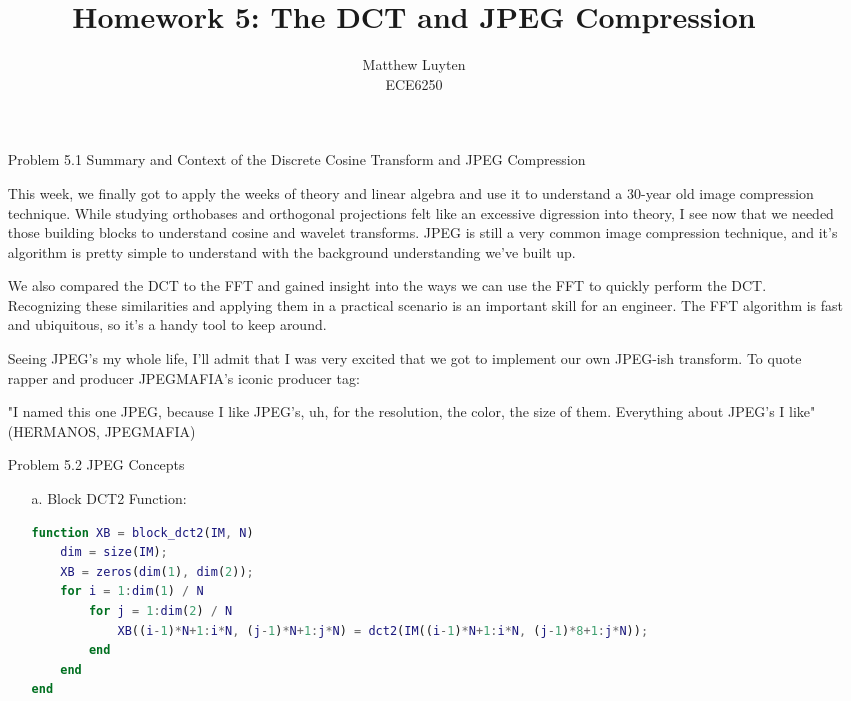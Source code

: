 \documentclass[12pt]{article}
\begin{document}
 
\title{Homework 5: The DCT and JPEG Compression}
\author{Matthew Luyten\\
ECE6250}

\maketitle

\begin{enumerate}
\item[Problem 5.1] Summary and Context of the Discrete Cosine Transform and JPEG Compression

This week, we finally got to apply the weeks of theory and linear algebra and use it to understand
a 30-year old image compression technique. While studying orthobases and orthogonal projections
felt like an excessive digression into theory, I see now that we needed those building blocks to
understand cosine and wavelet transforms. JPEG is still a very common image compression technique,
and it's algorithm is pretty simple to understand with the background understanding we've built up.

We also compared the DCT to the FFT and gained insight into the ways we can use the FFT to quickly
perform the DCT. Recognizing these similarities and applying them in a practical scenario is an
important skill for an engineer. The FFT algorithm is fast and ubiquitous, so it's a handy tool
to keep around.

Seeing JPEG's my whole life, I'll admit that I was very excited that we got to implement our own
JPEG-ish transform. To quote rapper and producer JPEGMAFIA's iconic producer tag:

"I named this one JPEG, because I like JPEG's, uh, for the resolution, the color, the size of them.
Everything about JPEG's I like" (HERMANOS, JPEGMAFIA)

\newpage

\item[Problem 5.2] JPEG Concepts

\begin{enumerate}

\item[a.] Block DCT2 Function:
\begin{lstlisting}[language=matlab]
function XB = block_dct2(IM, N)
    dim = size(IM);
    XB = zeros(dim(1), dim(2));
    for i = 1:dim(1) / N
        for j = 1:dim(2) / N
            XB((i-1)*N+1:i*N, (j-1)*N+1:j*N) = dct2(IM((i-1)*N+1:i*N, (j-1)*8+1:j*N));
        end
    end
end
\end{lstlisting}


\end{enumerate}
\end{enumerate}
\end{document}
